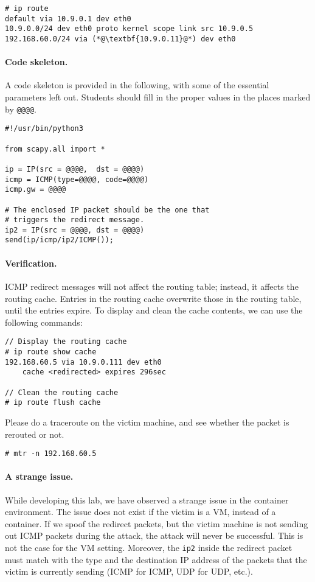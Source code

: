 \begin{lstlisting}
# ip route
default via 10.9.0.1 dev eth0 
10.9.0.0/24 dev eth0 proto kernel scope link src 10.9.0.5 
192.168.60.0/24 via (*@\textbf{10.9.0.11}@*) dev eth0
\end{lstlisting}
 

\paragraph{Code skeleton.} A code skeleton is provided in the following, with
some of the essential parameters left out. Students should fill in the proper 
values in the places marked by \texttt{@@@@}.  


\begin{lstlisting}
#!/usr/bin/python3

from scapy.all import *

ip = IP(src = @@@@,  dst = @@@@)
icmp = ICMP(type=@@@@, code=@@@@)
icmp.gw = @@@@

# The enclosed IP packet should be the one that 
# triggers the redirect message. 
ip2 = IP(src = @@@@, dst = @@@@)
send(ip/icmp/ip2/ICMP());
\end{lstlisting}
 

\paragraph{Verification.}
ICMP redirect messages will not affect the routing table; instead, it 
affects the routing cache. Entries in the routing cache overwrite 
those in the routing table, until the entries expire. To display 
and clean the cache contents, we can use the following commands: 

\begin{lstlisting}
// Display the routing cache 
# ip route show cache
192.168.60.5 via 10.9.0.111 dev eth0
    cache <redirected> expires 296sec

// Clean the routing cache
# ip route flush cache
\end{lstlisting}


Please do a traceroute on the victim machine, and see whether the packet
is rerouted or not. 

\begin{lstlisting}
# mtr -n 192.168.60.5
\end{lstlisting}
 



\paragraph{A strange issue.} While developing this lab, we have observed
a strange issue in the container environment. The issue does not exist
if the victim is a VM, instead of a container. 
If we spoof the redirect packets, but the victim machine is not 
sending out ICMP packets during the attack, the attack will never be successful. 
This is not the case for the VM setting. 
Moreover, the \texttt{ip2} inside the redirect packet must match with the
type and the destination IP address of the packets 
that the victim is currently sending (ICMP for ICMP,
UDP for UDP, etc.). 


